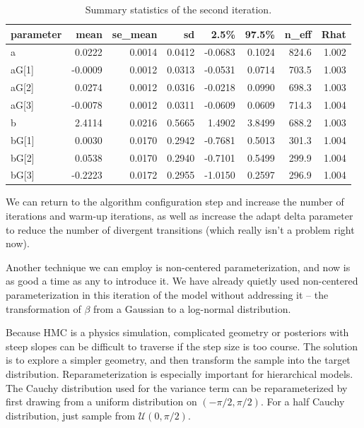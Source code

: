 \documentclass[11pt, oneside, openany]{scrbook}
\begin{document}
\begin{table}[!h]

\caption{\label{tab:ch042-Liquid-Strawberry-Eagle}Summary statistics of the second iteration.}
\centering
\begin{tabular}[t]{lrrrrrrr}
\toprule
parameter & mean & se\_mean & sd & 2.5\% & 97.5\% & n\_eff & Rhat\\
\midrule
a & 0.0222 & 0.0014 & 0.0412 & -0.0683 & 0.1024 & 824.6 & 1.002\\
aG[1] & -0.0009 & 0.0012 & 0.0313 & -0.0531 & 0.0714 & 703.5 & 1.003\\
aG[2] & 0.0274 & 0.0012 & 0.0316 & -0.0218 & 0.0990 & 698.3 & 1.003\\
aG[3] & -0.0078 & 0.0012 & 0.0311 & -0.0609 & 0.0609 & 714.3 & 1.004\\
b & 2.4114 & 0.0216 & 0.5665 & 1.4902 & 3.8499 & 688.2 & 1.003\\
\addlinespace
bG[1] & 0.0030 & 0.0170 & 0.2942 & -0.7681 & 0.5013 & 301.3 & 1.004\\
bG[2] & 0.0538 & 0.0170 & 0.2940 & -0.7101 & 0.5499 & 299.9 & 1.004\\
bG[3] & -0.2223 & 0.0172 & 0.2955 & -1.0150 & 0.2597 & 296.9 & 1.004\\
\bottomrule
\end{tabular}
\end{table}

We can return to the algorithm configuration step and increase the number of iterations and warm-up iterations, as well as increase the adapt delta parameter to reduce the number of divergent transitions (which really isn't a problem right now).

Another technique we can employ is non-centered parameterization, and now is as good a time as any to introduce it. We have already quietly used non-centered parameterization in this iteration of the model without addressing it -- the transformation of \(\beta\) from a Gaussian to a log-normal distribution.

Because HMC is a physics simulation, complicated geometry or posteriors with steep slopes can be difficult to traverse if the step size is too course. The solution is to explore a simpler geometry, and then transform the sample into the target distribution. Reparameterization is especially important for hierarchical models. The Cauchy distribution used for the variance term can be reparameterized by first drawing from a uniform distribution on \((-\pi/2, \pi/2)\). For a half Cauchy distribution, just sample from \(\mathcal{U}(0, \pi/2)\).
\end{document}
